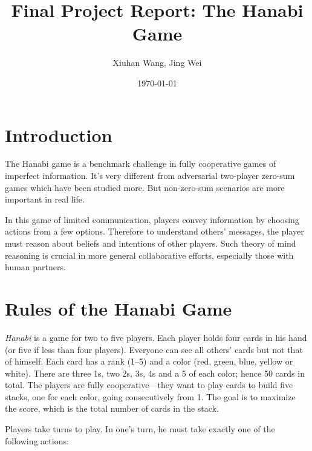 \documentclass[12pt]{article}
\begin{document}
\begin{spacing}{1.15}
\title{\bf Final Project Report: The Hanabi Game}
\author{Xiuhan Wang, Jing Wei}
\date{\today}
\maketitle

\section{Introduction}
The Hanabi game is a benchmark challenge in fully cooperative games of imperfect information. It's very different from adversarial two-player zero-sum games which have been studied more. But non-zero-sum scenarios are more important in real life.

In this game of limited communication, players convey information by choosing actions from a few options. Therefore to understand others' messages, the player must reason about beliefs and intentions of other players. Such theory of mind reasoning is crucial in more general collaborative efforts, especially those with human partners.\cite{bard2020the}

\section{Rules of the Hanabi Game}

\textsl{Hanabi} is a game for two to five players. Each player holds four cards in his hand (or five if less than four players). Everyone can see all others' cards but not that of himself. Each card has a rank (1--5) and a color (red, green, blue, yellow or white). There are three 1s, two 2s, 3s, 4s and a 5 of each color; hence 50 cards in total. The players are fully cooperative---they want to play cards to build five stacks, one for each color, going consecutively from 1. The goal is to maximize the score, which is the total number of cards in the stack.

Players take turns to play. In one's turn, he must take exactly one of the following actions:


\end{spacing}
\end{document}
